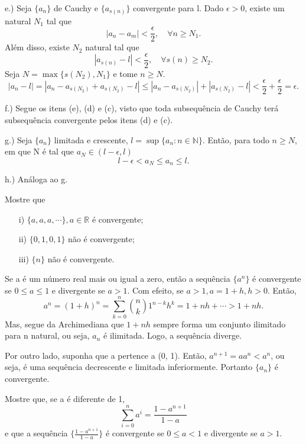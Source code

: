 \documentclass[analysis_notes.tex]{subfiles}
\begin{document}
\begin{proof*}
	e.) Seja $\{a_{n}\}$ de Cauchy e $\{a_{s(n)}\}$ convergente para l. Dado $\epsilon > 0$, existe um natural $N_{1}$ tal que
	$$
		|a_{n}-a_{m}| < \frac{\epsilon}{2},\quad\forall n\geq{N_{1}}.
	$$
	Além disso, existe $N_{2}$ natural tal que
	$$
		|a_{s(n)} - l| < \frac{\epsilon}{2},\quad\forall s(n)\geq{N_{2}}.
	$$
	Seja $N=\max\{s(N_{2}), N_{1}\}$ e tome $n\geq{N}.$
	$$
		|a_{n}-l| = |a_{n} - a_{s(N_{2})} + a_{s(N_{2})} - l| \leq{|a_{n}-a_{s(N_{2})}| + |a_{s(N_{2})} - l|} < \frac{\epsilon}{2} + \frac{\epsilon}{2} = \epsilon.
	$$

	f.) Segue os itens (e), (d) e (c), visto que toda subsequência de Cauchy ter\'a subsequ\^encia convergente pelos itens (d) e (c).

	g.) Seja $\{a_{n}\}$ limitada e crescente, $l = \sup\{a_{n}:n\in \mathbb{N}\}.$ Ent\~ao, para todo $n \geq{N}$, em que N é tal que $a_{N}\in(l-\epsilon, l)$
	$$
		l-\epsilon < a_{N}\leq{a_{n}} \leq{l}.
	$$

	h.) An\'aloga ao g.
\end{proof*}
\begin{example}
	Mostre que
	\begin{itemize}
		\item[i)] $\{a, a, a, \cdots\},a\in \mathbb{R}$ é convergente;
		\item[ii)] $\{0, 1, 0, 1\}$ n\~ao é convergente;
		\item[iii)] $\{n\}$ n\~ao é convergente.
	\end{itemize}
\end{example}
\begin{example}
	Se a é um n\'umero real mais ou igual a zero, ent\~ao a sequência $\{a^{n}\}$ \'e convergente se $0\leq{a}\leq{1}$ e divergente
	se $a > 1$. Com efeito, se $a > 1, a = 1 + h, h > 0$. Ent\~ao,
	$$
		a^{n} = (1+h)^{n} = \sum\limits_{k=0}^{n}\binom{n}{k}1^{n-k}h^{k} = 1 + nh + \cdots > 1 + nh.
	$$
	Mas, segue da Archimediana que $1 + nh$ sempre forma um conjunto ilimitado para n natural, ou seja, $a_{n}$ é ilimitada. Logo, a sequência
	diverge.

	Por outro lado, suponha que a pertence a (0, 1). Ent\~ao, $a^{n+1} = a a^{n} < a^{n}$, ou seja, é uma sequência decrescente e limitada inferiormente.
	Portanto $\{a_{n}\}$ é convergente.
\end{example}
\begin{example}
	Mostre que, se a é diferente de 1,
	$$
		\sum\limits_{i=0}^{n}a^{i} = \frac{1-a^{n+1}}{1-a}
	$$
	e que a sequência $\biggl\{\frac{1-a^{n+1}}{1-a}\biggr\}$ é convergente se $0\leq{a}<1$ e divergente se $a > 1$.
\end{example}
\end{document}

